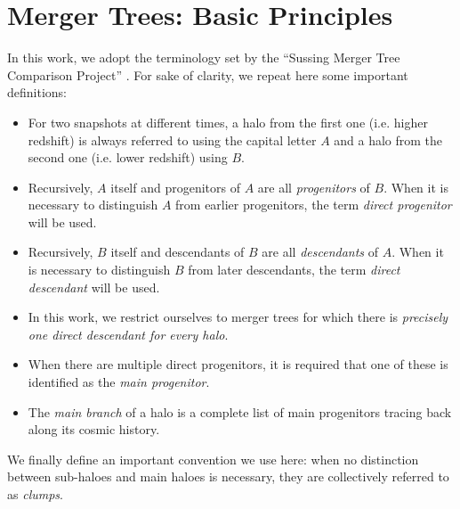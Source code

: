 \documentclass[a4paper,twocolumn,fleqn,usenatbib]{mnras}
\providecommand{\DIFaddbegin}{} %
\providecommand{\DIFaddend}{} %
\providecommand{\DIFdelbegin}{} %
\providecommand{\DIFdelend}{} %
\newcommand{\DIFscaledelfig}{0.5}
\newlength{\DIFdelgraphicswidth} %
\newlength{\DIFdelgraphicsheight} %
\newcommand{\DIFaddincludegraphics}[2][]{{\color{blue}\fbox{\DIFOincludegraphics[#1]{#2}}}} %
\newcommand{\DIFdelincludegraphics}[2][]{%
\sbox{\DIFdelgraphicsbox}{\DIFOincludegraphics[#1]{#2}}%
\settoboxwidth{\DIFdelgraphicswidth}{\DIFdelgraphicsbox} %
\settoboxtotalheight{\DIFdelgraphicsheight}{\DIFdelgraphicsbox} %
\scalebox{\DIFscaledelfig}{%
\parbox[b]{\DIFdelgraphicswidth}{\usebox{\DIFdelgraphicsbox}\\[-\baselineskip] \rule{\DIFdelgraphicswidth}{0em}}\llap{\resizebox{\DIFdelgraphicswidth}{\DIFdelgraphicsheight}{%
\setlength{\unitlength}{\DIFdelgraphicswidth}%
\begin{picture}(1,1)%
\thicklines\linethickness{2pt} %
{\color[rgb]{1,0,0}\put(0,0){\framebox(1,1){}}}%
{\color[rgb]{1,0,0}\put(0,0){\line( 1,1){1}}}%
{\color[rgb]{1,0,0}\put(0,1){\line(1,-1){1}}}%
\end{picture}%
}\hspace*{3pt}}} %
} %
\DeclareRobustCommand{\DIFaddbegin}{\DIFOaddbegin \let\includegraphics\DIFaddincludegraphics} %
\DeclareRobustCommand{\DIFaddend}{\DIFOaddend \let\includegraphics\DIFOincludegraphics} %
\DeclareRobustCommand{\DIFdelbegin}{\DIFOdelbegin \let\includegraphics\DIFdelincludegraphics} %
\DeclareRobustCommand{\DIFdelend}{\DIFOaddend \let\includegraphics\DIFOincludegraphics} %
\begin{document}
\section{Merger Trees: Basic Principles}\DIFdelbegin %
\DIFdelend \DIFaddbegin \label{chap:making_trees}
\DIFaddend %

In this work, we adopt the terminology set by the ``Sussing Merger
Tree Comparison Project'' \citep{SUSSING_COMPARISON,
  SUSSING_CONVERGENCE, SUSSING_HALOFINDER,leeSussingMergerTrees2014a}.
For sake of clarity, we repeat here some important definitions:

\begin{itemize}

\item For two snapshots at different times, a halo from the first one
  (i.e. higher redshift) is always referred to using the capital
  letter $A$ and a halo from the second one (i.e. lower redshift)
  using $B$.

\item Recursively, $A$ itself and progenitors of $A$ are all
  \emph{progenitors} of $B$.  When it is necessary to distinguish $A$
  from earlier progenitors, the term \emph{direct progenitor} will be
  used.

\item Recursively, $B$ itself and descendants of $B$ are all
  \emph{descendants} of $A$.  When it is necessary to distinguish $B$
  from later descendants, the term \emph{direct descendant} will be
  used.

\item In this work, we restrict ourselves to merger trees for which
  there is \emph{precisely one direct descendant for every halo}.

\item When there are multiple direct progenitors, it is required that
  one of these is identified as the \emph{main progenitor}.

\item The \emph{main branch} of a halo is a complete list of main
  progenitors tracing back along its cosmic history.

\end{itemize}
We finally define an important convention we use here: when no
distinction between sub-haloes and main haloes is necessary, they are
collectively referred to as \emph{clumps}.
\end{document}
